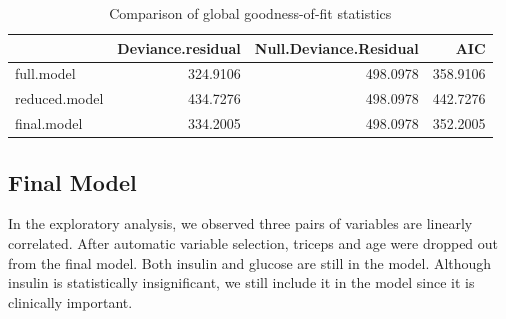 \documentclass[
]{book}
\newenvironment{Shaded}{\begin{snugshade}}{\end{snugshade}}
\newcommand{\AttributeTok}[1]{\textcolor[rgb]{0.13,0.29,0.53}{#1}}
\newcommand{\CommentTok}[1]{\textcolor[rgb]{0.56,0.35,0.01}{\textit{#1}}}
\newcommand{\FunctionTok}[1]{\textcolor[rgb]{0.13,0.29,0.53}{\textbf{#1}}}
\newcommand{\NormalTok}[1]{#1}
\newcommand{\OtherTok}[1]{\textcolor[rgb]{0.56,0.35,0.01}{#1}}
\newcommand{\SpecialCharTok}[1]{\textcolor[rgb]{0.81,0.36,0.00}{\textbf{#1}}}
\newcommand{\StringTok}[1]{\textcolor[rgb]{0.31,0.60,0.02}{#1}}
\begin{document}
\begin{table}

\caption{\label{tab:unnamed-chunk-137}Comparison of global goodness-of-fit statistics}
\centering
\begin{tabular}[t]{l|r|r|r}
\hline
  & Deviance.residual & Null.Deviance.Residual & AIC\\
\hline
full.model & 324.9106 & 498.0978 & 358.9106\\
\hline
reduced.model & 434.7276 & 498.0978 & 442.7276\\
\hline
final.model & 334.2005 & 498.0978 & 352.2005\\
\hline
\end{tabular}
\end{table}

\hypertarget{final-model-1}{%
\subsection{Final Model}\label{final-model-1}}

In the exploratory analysis, we observed three pairs of variables are linearly correlated. After automatic variable selection, triceps and age were dropped out from the final model. Both insulin and glucose are still in the model. Although insulin is statistically insignificant, we still include it in the model since it is clinically important.

\begin{Shaded}
\end{Shaded}
\end{document}
